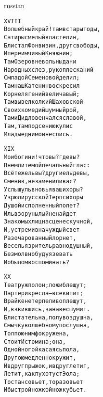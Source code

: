 \documentclass[12pt,twocolumn]{article}
\begin{document}
\begin{center}
\begin{otherlanguage*}{russian}
\begin{minipage}[t]{\dimexpr 0.5\textwidth -\tabcolsep-.5pt}
\begin{alltt}\normalfont\centering
XVIII
Волшебный край! там в стары годы,
Сатиры смелый властелин,
Блистал Фонвизин, друг свободы,
И переимчивый Княжнин;
Там Озеров невольны дани
Народных слез, рукоплесканий
С младой Семеновой делил;
Там наш Катенин воскресил
Корнеля гений величавый;
Там вывел колкий Шаховской
Своих комедий шумный рой,
Там и Дидло венчался славой,
Там, там под сению кулис
Младые дни мои неслись.
\end{alltt}
\end{minipage}
\clearpage

\begin{minipage}[t]{\dimexpr 0.5\textwidth -\tabcolsep-.5pt}
\begin{alltt}\normalfont\centering
XIX
Мои богини! что вы? где вы?
Внемлите мой печальный глас:
Всё те же ль вы? другие ль девы,
Сменив, не заменили вас?
Услышу ль вновь я ваши хоры?
Узрю ли русской Терпсихоры
Душой исполненный полет?
Иль взор унылый не найдет
Знакомых лиц на сцене скучной,
И, устремив на чуждый свет
Разочарованный лорнет,
Веселья зритель равнодушный,
Безмолвно буду я зевать
И о былом воспоминать?
\end{alltt}
\end{minipage}

\begin{minipage}[t]{\dimexpr 0.5\textwidth -\tabcolsep-.5pt}
\begin{alltt}\normalfont\centering
XX
Театр уж полон; ложи блещут;
Партер и кресла — все кипит;
В райке нетерпеливо плещут,
И, взвившись, занавес шумит.
Блистательна, полувоздушна,
Смычку волшебному послушна,
Толпою нимф окружена,
Стоит Истомина; она,
Одной ногой касаясь пола,
Другою медленно кружит,
И вдруг прыжок, и вдруг летит,
Летит, как пух от уст Эола;
То стан совьет, то разовьет
И быстрой ножкой ножку бьет.
\end{alltt}
\end{minipage}

\end{otherlanguage*}
\end{center}
\end{document}
